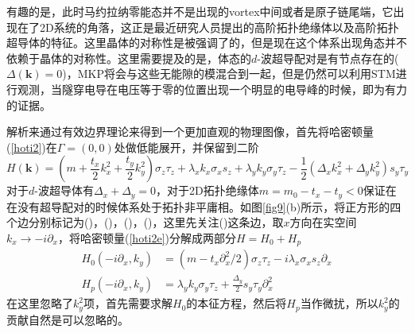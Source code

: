 有趣的是，此时马约拉纳零能态并不是出现的vortex中间或者是原子链尾端，它出现在了2D系统的角落，这正是最近研究人员提出的高阶拓扑绝缘体以及高阶拓扑超导体的特征。这里晶体的对称性是被强调了的，但是现在这个体系出现角态并不依赖于晶体的对称性。这里需要提及的是，体态的$d$-波超导配对是有节点存在的($\Delta(\mathbf{k})=0$)，MKP将会与这些无能隙的模混合到一起，但是仍然可以利用STM进行观测，当隧穿电导在电压等于零的位置出现一个明显的电导峰的时候，即为有力的证据。

 解析来通过有效边界理论来得到一个更加直观的物理图像，首先将哈密顿量(\ref{hoti2})在$\Gamma=(0,0)$处做低能展开，并保留到二阶
\begin{equation}
H(\mathbf{k})=(m+\frac{t_x}{2}k_x^2+\frac{t_y}{2}k_y^2)\sigma_z\tau_z+\lambda_xk_x\sigma_xs_z+\lambda_yk_y\sigma_y\tau_z-\frac{1}{2}(\Delta_xk_x^2+\Delta_yk_y^2)s_y\tau_y\label{hoti2e}
\end{equation}
对于$d$-波超导体有$\Delta_x+\Delta_y=0$，对于2D拓扑绝缘体$m=m_0-t_x-t_y<0$保证在在没有超导配对的时候体系处于拓扑非平庸相。如图\ref{fig9}(b)所示，将正方形的四个边分别标记为(\uppercase\expandafter{})，(\uppercase\expandafter{})，(\uppercase\expandafter{})，(\uppercase\expandafter{})，这里先关注(\uppercase\expandafter{})这条边，取$x$方向在实空间$k_x\rightarrow-i\partial_x$，将哈密顿量(\ref{hoti2e})分解成两部分$H=H_0+H_p$
\begin{equation}
\begin{aligned}
H_0(-i\partial_x,k_y)&=(m-t_x\partial_x^2/2)\sigma_z\tau_z-i\lambda_x\sigma_xs_z\partial_x\\
H_p(-i\partial_x,k_y)&=\lambda_yk_y\sigma_y\tau_z+\frac{\Delta_y}{2}s_y\tau_y\partial_x^2
\end{aligned}
\end{equation}
在这里忽略了$k_y^2$项，首先需要求解$H_0$的本征方程，然后将$H_p$当作微扰，所以$k_y^2$的贡献自然是可以忽略的。

